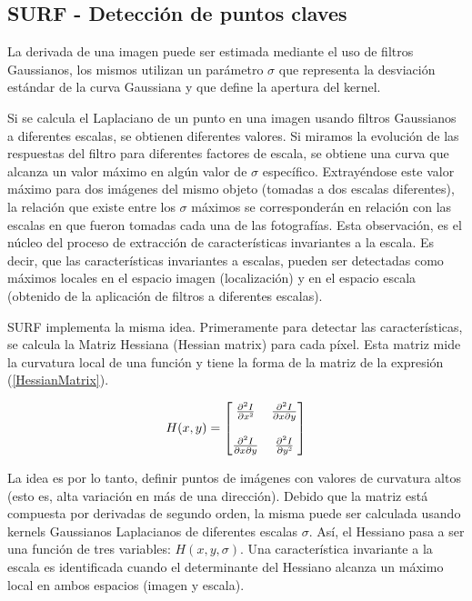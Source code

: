 \documentclass[a4paper,11pt,spanish]{article}
\begin{document}
\subsection{SURF - Detección de puntos claves}
La derivada de una imagen puede ser estimada mediante el uso de filtros Gaussianos, los mismos utilizan un parámetro $\sigma$ que representa la desviación estándar de la curva Gaussiana y que define la apertura del kernel. %

Si se calcula el Laplaciano de un punto en una imagen usando filtros Gaussianos a diferentes escalas, se obtienen diferentes valores. Si miramos la evolución de las respuestas del filtro para diferentes factores de escala, se  obtiene una curva que alcanza un valor máximo en algún valor de $\sigma$ específico. Extrayéndose este valor máximo para dos imágenes del mismo objeto (tomadas a dos escalas diferentes), la relación que existe entre los $\sigma
$ máximos se corresponderán en relación con las escalas en que fueron tomadas cada una de las fotografías. Esta observación, es el núcleo del proceso de extracción de características invariantes a la escala. Es decir, que las características invariantes a escalas, pueden ser detectadas como máximos locales en el espacio imagen (localización) y en el espacio escala (obtenido de la aplicación de filtros a diferentes escalas).

SURF implementa la misma idea. Primeramente para detectar las características, se calcula la Matriz Hessiana (Hessian matrix) para cada píxel. Esta matriz mide la curvatura local de una función y tiene la forma de la matriz de la expresión (\ref{HessianMatrix}).

\begin{equation}
H(x,y)=\begin{bmatrix}\frac{\partial^{2}I}{\partial x\text{\texttwosuperior}} & \frac{\partial^{2}I}{\partial x\partial y}\\
 & \\
\frac{\partial^{2}I}{\partial x\partial y} & \frac{\partial^{2}I}{\partial y\text{\texttwosuperior}}
\end{bmatrix}\label{HessianMatrix}
\end{equation}

La idea es por lo tanto, definir %
puntos de imágenes con valores de curvatura altos (esto es, alta variación en más de una dirección). Debido que la matriz está compuesta por derivadas de segundo orden, la misma puede ser calculada usando kernels Gaussianos Laplacianos de diferentes escalas $\sigma$. Así, el Hessiano pasa a ser una función de tres variables: $H(x,y,\sigma)$. Una característica invariante a la escala es identificada cuando el determinante del Hessiano alcanza un máximo local en ambos espacios (imagen y escala). %
\end{document}
